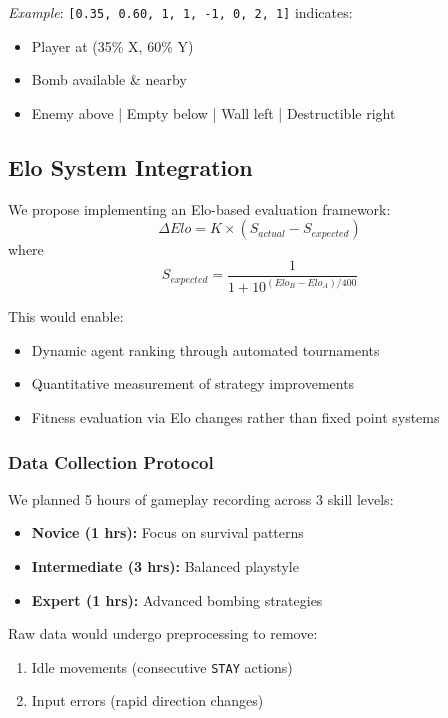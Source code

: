 \documentclass[sigconf]{acmart} %
\begin{document}
\textit{Example}: \texttt{[0.35, 0.60, 1, 1, -1, 0, 2, 1]} indicates:
\begin{itemize}
	\item Player at (35\% X, 60\% Y)
	\item Bomb available \& nearby
	\item Enemy above | Empty below | Wall left | Destructible right
\end{itemize}

\subsection{Elo System Integration}
We propose implementing an Elo-based evaluation framework:
\begin{equation}
	\Delta Elo = K \times (S_{actual} - S_{expected})
\end{equation}
where 
\begin{equation}
	S_{expected} = \frac{1}{1 + 10^{(Elo_B - Elo_A)/400}}
\end{equation}

This would enable:
\begin{itemize}
	\item Dynamic agent ranking through automated tournaments
	\item Quantitative measurement of strategy improvements
	\item Fitness evaluation via Elo changes rather than fixed point systems
\end{itemize}

\subsubsection{Data Collection Protocol}
We planned 5 hours of gameplay recording across 3 skill levels:
\begin{itemize}
	\item \textbf{Novice (1 hrs):} Focus on survival patterns
	\item \textbf{Intermediate (3 hrs):} Balanced playstyle
	\item \textbf{Expert (1 hrs):} Advanced bombing strategies
\end{itemize}
Raw data would undergo preprocessing to remove:
\begin{enumerate}
	\item Idle movements (consecutive \texttt{STAY} actions)
	\item Input errors (rapid direction changes)
\end{enumerate}
\end{document}
